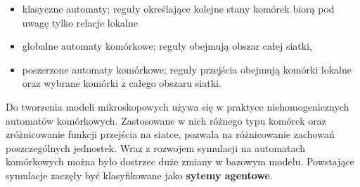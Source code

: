 \begin{itemize}
\item klasyczne automaty; reguły określające kolejne stany komórek biorą pod uwagę tylko relacje lokalne
\item globalne automaty komórkowe; reguły obejmują obszar całej siatki,
\item poszerzone automaty komórkowe; reguły przejścia obejmują komórki lokalne oraz wybrane komórki z całego obszaru siatki.
\end{itemize}

Do tworzenia modeli mikroskopowych używa się w praktyce niehomogenicznych automatów komórkowych\cite{modelowanieDynamikiTlumu}. Zastosowane w nich różnego typu komórek oraz zróżnicowanie funkcji przejścia na siatce, pozwala na różnicowanie zachowań poszczególnych jednostek. Wraz z rozwojem symulacji na automatach komórkowych można było dostrzec duże zmiany w bazowym modelu. Powstające symulacje zaczęły być klasyfikowane jako \textbf{sytemy agentowe}.




















